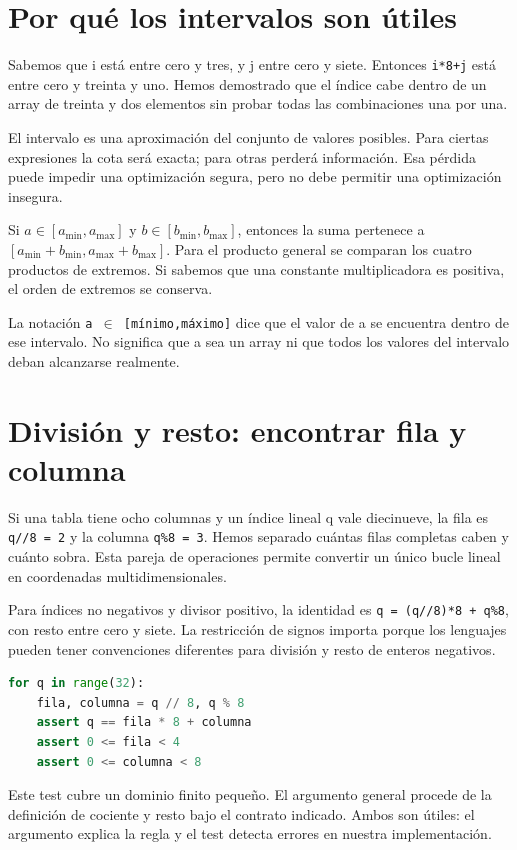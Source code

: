 \documentclass[12pt,a4paper,oneside]{report}
\begin{document}
\section{Por qué los intervalos son útiles}
Sabemos que i está entre cero y tres, y j entre cero y siete. Entonces \texttt{i*8+j} está entre cero y treinta y uno. Hemos demostrado que el índice cabe dentro de un array de treinta y dos elementos sin probar todas las combinaciones una por una.

El intervalo es una aproximación del conjunto de valores posibles. Para ciertas expresiones la cota será exacta; para otras perderá información. Esa pérdida puede impedir una optimización segura, pero no debe permitir una optimización insegura.

\begin{traduccion}
Si $a\in[a_{\min},a_{\max}]$ y $b\in[b_{\min},b_{\max}]$, entonces la suma pertenece a $[a_{\min}+b_{\min},a_{\max}+b_{\max}]$. Para el producto general se comparan los cuatro productos de extremos. Si sabemos que una constante multiplicadora es positiva, el orden de extremos se conserva.

\end{traduccion}
La notación \texttt{a \ensuremath{\in} [mínimo,máximo]} dice que el valor de a se encuentra dentro de ese intervalo. No significa que a sea un array ni que todos los valores del intervalo deban alcanzarse realmente.

\section{División y resto: encontrar fila y columna}
Si una tabla tiene ocho columnas y un índice lineal q vale diecinueve, la fila es \texttt{q//8 = 2} y la columna \texttt{q\%8 = 3}. Hemos separado cuántas filas completas caben y cuánto sobra. Esta pareja de operaciones permite convertir un único bucle lineal en coordenadas multidimensionales.

Para índices no negativos y divisor positivo, la identidad es \texttt{q = (q//8)*8 + q\%8}, con resto entre cero y siete. La restricción de signos importa porque los lenguajes pueden tener convenciones diferentes para división y resto de enteros negativos.

\begin{lstlisting}[language=Python]
for q in range(32):
    fila, columna = q // 8, q % 8
    assert q == fila * 8 + columna
    assert 0 <= fila < 4
    assert 0 <= columna < 8
\end{lstlisting}
Este test cubre un dominio finito pequeño. El argumento general procede de la definición de cociente y resto bajo el contrato indicado. Ambos son útiles: el argumento explica la regla y el test detecta errores en nuestra implementación.
\end{document}
